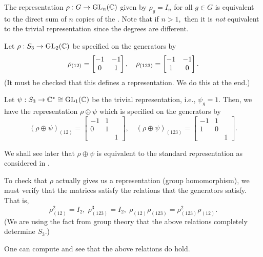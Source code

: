 \begin{ex} \label{ex:directsumoftrivialreps}
	The representation $\rho: G \to \operatorname{GL}_n(\mathbb{C})$ given by $\rho_g = I_n$ for all $g \in G$ is equivalent to the direct sum of $n$ copies of the . Note that if $n > 1,$ then it is \emph{not} equivalent to the trivial representation since the degrees are different.
\end{ex}

\begin{ex} \label{ex:S3GL2Crho}
	Let $\rho:S_3 \to \operatorname{GL}_2(\mathbb{C})$ be specified on the generators by
	\begin{equation*} 
		\rho_{(12)} = \begin{bmatrix} -1 & -1 \\ 0 & 1 \end{bmatrix}, \quad \rho_{(123)} = \begin{bmatrix} -1 & -1 \\ 1 & 0 \end{bmatrix}.
	\end{equation*}
	(It must be checked that this defines a representation. We do this at the end.) 

	Let $\psi:S_3 \to \mathbb{C}^* \cong \operatorname{GL}_1(\mathbb{C})$ be the trivial representation, i.e., $\psi_g = 1.$ Then, we have the representation $\rho \oplus \psi$ which is specified on the generators by
	\begin{equation*} 
		(\rho \oplus \psi)_{(12)} = \begin{bmatrix}
			-1 & 1 & \\
			0 & 1 & \\
			& & 1
		\end{bmatrix}, \quad (\rho \oplus \psi)_{(123)} = \begin{bmatrix}
			-1 & 1 & \\
			1 & 0 & \\
			& & 1
		\end{bmatrix}.
	\end{equation*}

	We shall see later that $\rho\oplus\psi$ is equivalent to the standard representation as considered in . %
	
	\hrulefill
	
	To check that $\rho$ actually gives us a representation (group homomorphism), we must verify that the matrices satisfy the relations that the generators satisfy. That is,
	\begin{equation*} 
		\rho_{(12)}^2 = I_2,\;\rho_{(123)}^3 = I_2,\; \rho_{(12)}\rho_{(123)} = \rho_{(123)}^2\rho_{(12)}.
	\end{equation*}
	(We are using the fact from group theory that the above relations completely determine $S_3.$)

	One can compute and see that the above relations do hold. %
\end{ex}

